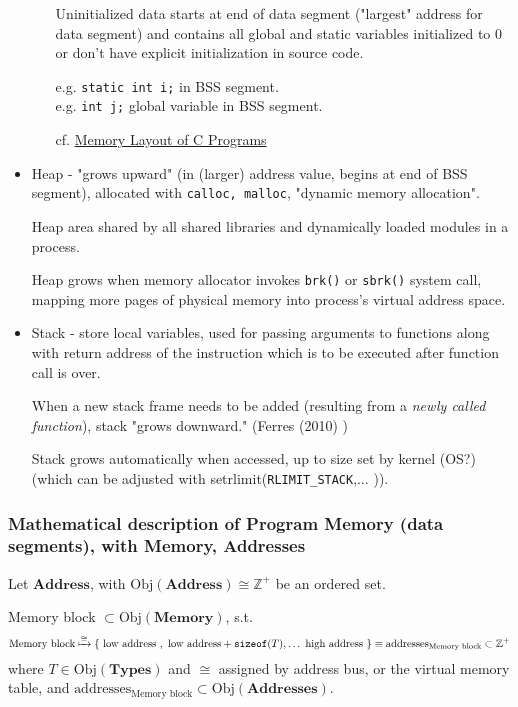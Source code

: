 \documentclass[10pt]{amsart}
\begin{document}
\begin{multicols*}{2}
\begin{itemize}
\begin{itemize}
		Uninitialized data starts at end of data segment ("largest" address for data segment) and contains all global and static variables initialized to 0 or don't have explicit initialization in source code.  
		
		e.g. \verb|static int i;| in BSS segment.  \\
		e.g. \verb|int j;| global variable in BSS segment. 	
		
		cf. \href{http://www.geeksforgeeks.org/memory-layout-of-c-program/}{Memory Layout of C Programs}  
		
	\end{itemize}
	\item Heap - "grows upward" (in (larger) address value, begins at end of BSS segment), allocated with \verb|calloc, malloc|, "dynamic memory allocation".    
	
	Heap area shared by all shared libraries and dynamically loaded modules in a process.  
	
	Heap grows when memory allocator invokes \verb|brk()| or \verb|sbrk()| system call, mapping more pages of physical memory into process's virtual address space.  
	
	\item Stack - store local variables, used for passing arguments to functions along with return address of the instruction which is to be executed after function call is over.  
	
	When a new stack frame needs to be added (resulting from a \emph{newly called function}), stack "grows downward."  (Ferres (2010) \cite{Ferr2010})  
	
	Stack grows automatically when accessed, up to size set by kernel (OS?) (which can be adjusted with setrlimit(\verb|RLIMIT_STACK|,$\ldots$ )).  \\
\end{itemize}

\subsubsection{Mathematical description of Program Memory (data segments), with \textbf{Memory}, \textbf{Addresses}}  

Let $\textbf{Address}$, with $\text{Obj}{(\textbf{Address})} \cong \mathbb{Z}^+$ be an ordered set.  

Memory block $\subset \text{Obj}{(\textbf{Memory})}$, s.t. 
\[
\text{Memory block} \xmapsto{ \cong } \lbrace \text{ low address }, \text{ low address} + \texttt{sizeof}(T) , \dots \text{ high address } \rbrace  \equiv \text{addresses}_{\text{Memory block} } \subset \mathbb{Z}^+
\]
where $T \in \text{Obj}{(\textbf{Types})}$ and $\cong$ assigned by address bus, or the virtual memory table, and $\text{addresses}_{\text{Memory block}} \subset \text{Obj}{(\textbf{Addresses})}$.  


\end{multicols*}
\end{document}
